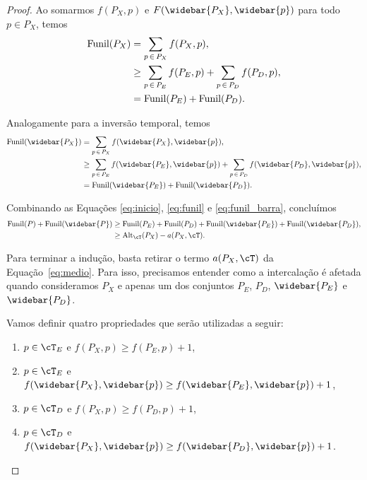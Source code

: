 \begin{proof}
    Ao somarmos $f(P_X,p)$ e $F(\widebar{P_X},\widebar{p})$ para todo $p \in P_X$, temos
    \begin{align}
        \text{Funil}(P_X) &= \sum_{p \, \in \, P_X}f(P_X,p), \notag\\
        &\geq \sum_{p \, \in \, P_E}f(P_E,p) + \sum_{p \, \in \, P_D}f(P_D,p), \notag \\
        &= \text{Funil}(P_E) + \text{Funil}(P_D). \label{eq:funil}
    \end{align}

    Analogamente para a inversão temporal, temos
    \begin{align}
        \text{Funil}(\widebar{P_X}) &= \sum_{p \, \in \, P_X}f(\widebar{P_X},\widebar{p}), \notag\\
        &\geq \sum_{p \, \in \, P_E}f(\widebar{P_E},\widebar{p}) + \sum_{p \, \in \, P_D}f(\widebar{P_D},\widebar{p}), \notag \\
        &= \text{Funil}(\widebar{P_E}) + \text{Funil}(\widebar{P_D}). \label{eq:funil_barra}
    \end{align}

    Combinando as Equações \ref{eq:inicio}, \ref{eq:funil} e \ref{eq:funil_barra}, concluímos
    \begin{align}
        \text{Funil}(P) + \text{Funil}(\widebar{P}) &\geq \text{Funil}(P_E) + \text{Funil}(P_D) + \text{Funil}(\widebar{P_E}) + \text{Funil}(\widebar{P_D}), \notag \\
        &\geq \text{Alt}_{\cT}(P_X) - a(P_X,\cT).
        \label{eq:medio}
    \end{align}

    Para terminar a indução, basta retirar o termo $a(P_X,\cT)$ da Equação~\ref{eq:medio}. Para isso, precisamos entender como a intercalação é afetada quando consideramos $P_X$ e apenas um dos conjuntos $P_E$, $P_D$, $\widebar{P_E}$ e $\widebar{P_D}$.

    Vamos definir quatro propriedades que serão utilizadas a seguir:
    \begin{enumerate}[label=(\alph*)]  %
        \item $p \in \cT_E$ e $f(P_X,p) \geq f(P_E,p) + 1$,
        \item $p \in \cT_E$ e $f(\widebar{P_X},\widebar{p}) \geq f(\widebar{P_E},\widebar{p}) + 1$,
        \item $p \in \cT_D$ e $f(P_X,p) \geq f(P_D,p) + 1$,
        \item $p \in \cT_D$ e $f(\widebar{P_X},\widebar{p}) \geq f(\widebar{P_D},\widebar{p}) + 1$.
    \end{enumerate}


\end{proof}
